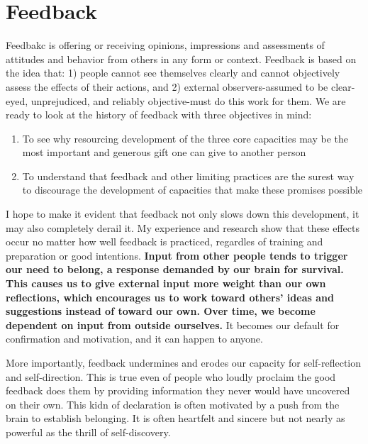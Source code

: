\documentclass[ebook,12pt,oneside,openany]{memoir}
\begin{document}
\section{Feedback}
Feedbakc is offering or receiving opinions, impressions and assessments of attitudes and behavior from others in any form or context.
Feedback is based on the idea that: 1) people cannot see themselves clearly and cannot objectively assess the effects of their actions, and 2) external observers-assumed to be clear-eyed, unprejudiced, and reliably objective-must do this work for them.
We are ready to look at the history of feedback with three objectives in mind:
\begin{enumerate}
    \item To see why resourcing development of the three core capacities may be the most important and generous gift one can give to another person
    \item To understand that feedback and other limiting practices are the surest way to discourage the development of capacities that make these promises possible
\end{enumerate}
I hope to make it evident that feedback not only slows down this development, it may also completely derail it. My experience and research show that these effects occur no matter how well feedback is practiced,
regardles of training and preparation or good intentions. 
\textbf{Input from other people tends to trigger our need to belong, a response demanded by our brain for survival. This causes us to give external input more weight than our own reflections, which encourages us to work toward others' ideas and suggestions instead of toward our own. Over time, we become dependent on input from outside ourselves.}
It becomes our default for confirmation and motivation, and it can happen to anyone. 

More importantly, feedback undermines and erodes our capacity for self-reflection and self-direction. 
This is true even of people who loudly proclaim the good feedback does them by providing information they never would have uncovered on their own. This kidn of declaration is often motivated by a push from the brain to establish belonging.
It is often heartfelt and sincere but not nearly as powerful as the thrill of self-discovery.
\end{document}
